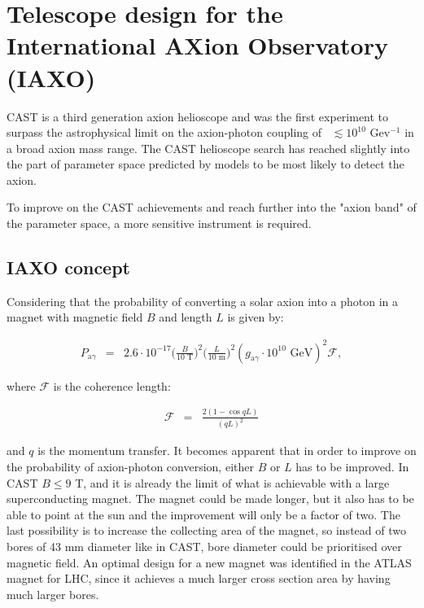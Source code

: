 \chapter{Telescope design for the International AXion Observatory (IAXO)}\label{chap:iaxo}

CAST is a third generation axion helioscope and was the first experiment to surpass the astrophysical limit on the axion-photon coupling of \gay\ $\lesssim 10^{10}$ Gev$^{-1}$ in a broad axion mass range. The CAST helioscope search has reached slightly into the part of parameter space predicted by models to be most likely to detect the axion.

To improve on the CAST achievements and reach further into the "axion band" of the parameter space, a more sensitive instrument is required.

\section{IAXO concept}
Considering that the probability of converting a solar axion into a photon in a magnet with magnetic field $B$ and length $L$ is given by\cite{Andriamonje:2007jc,Zioutas:2005jl,Sikivie:1983wx}:

\begin{eqnarray}
  P_{\text{a}\gamma} &=& 2.6\cdot10^{-17}\bigg(\frac{B}{10\text{ T}}\bigg)^2\bigg(\frac{L}{10\text{ m}}\bigg)^2(g_{\text{a}\gamma}\cdot10^{10}\text{\ GeV})^2\mathcal{F},
\end{eqnarray}

where $\mathcal{F}$ is the coherence length:

\begin{eqnarray}
  \mathcal{F} &=& \frac{2(1-\cos{qL})}{(qL)^2}
\end{eqnarray}

and $q$ is the momentum transfer. It becomes apparent that in order to improve on the probability of axion-photon conversion, either $B$ or $L$ has to be improved. In CAST $B \leq 9$ T, and it is already the limit of what is achievable with a large superconducting magnet. The magnet could be made longer, but it also has to be able to point at the sun and the improvement will only be a factor of two. The last possibility is to increase the collecting area of the magnet, so instead of two bores of 43 mm diameter like in CAST, bore diameter could be prioritised over magnetic field. An optimal design for a new magnet was identified\cite{Irastorza:1340820} in the ATLAS magnet for LHC\cite{Collaboration:1997vu}, since it achieves a much larger cross section area by having much larger bores.

